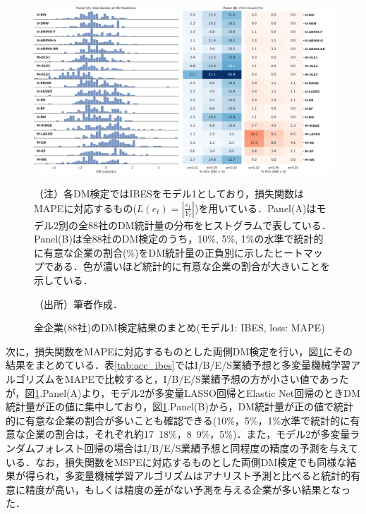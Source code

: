 \documentclass[a4paper，11pt]{jsarticle}
\begin{document}
\begin{figure}[tbp]
  \centering
  \caption{全企業(88社)のDM検定結果のまとめ(モデル1: IBES, loss: MAPE)}
  \label{fig:dm_ibes_mape}
  \includegraphics[width=\linewidth]{./img/_dm_MAPE_y_hat_ibes.pdf}
  \begin{threeparttable}
  \begin{tablenotes}
    \item[]（注）各DM検定ではIBESをモデル1としており，損失関数はMAPEに対応するもの($L(e_t)=\left|\frac{e_t}{Y_t}\right|$)を用いている．Panel(A)はモデル2別の全88社のDM統計量の分布をヒストグラムで表している．Panel(B)は全88社のDM検定のうち，10\%, 5\%, 1\%の水準で統計的に有意な企業の割合(\%)をDM統計量の正負別に示したヒートマップである．色が濃いほど統計的に有意な企業の割合が大きいことを示している．
    \item[]（出所）筆者作成．
  \end{tablenotes}
  \end{threeparttable}
\end{figure}

次に，損失関数をMAPEに対応するものとした両側DM検定を行い，図\ref{fig:dm_ibes_mape}にその結果をまとめている．表\ref{tab:acc_ibes}ではI/B/E/S業績予想と多変量機械学習アルゴリズムをMAPEで比較すると，I/B/E/S業績予想の方が小さい値であったが，図\ref{fig:dm_ibes_mape}.Panel(A)より，モデル2が多変量LASSO回帰とElastic Net回帰のときDM統計量が正の値に集中しており，図\ref{fig:dm_ibes_mape}.Panel(B)から，DM統計量が正の値で統計的に有意な企業の割合が多いことも確認できる(10\%，5\%，1\%水準で統計的に有意な企業の割合は，それぞれ約17~18\%，8~9\%，5\%)．また，モデル2が多変量ランダムフォレスト回帰の場合はI/B/E/S業績予想と同程度の精度の予測を与えている．なお，損失関数をMSPEに対応するものとした両側DM検定でも同様な結果が得られ，多変量機械学習アルゴリズムはアナリスト予測と比べると統計的有意に精度が高い，もしくは精度の差がない予測を与える企業が多い結果となった．
\end{document}
